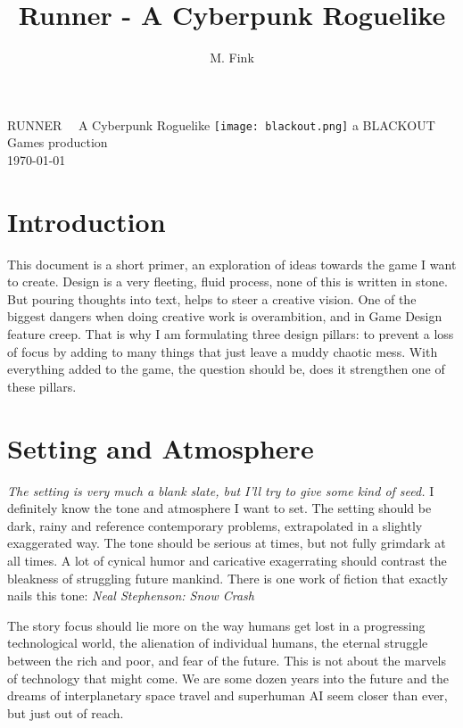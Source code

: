 \documentclass[11pt,a4paper, twocolumn]{article}
\begin{document}
\title{\LARGE{Runner - A Cyberpunk Roguelike}}
\author{M. Fink}



\begin{titlepage}
    \Huge{RUNNER}
    \Large{~~A Cyberpunk Roguelike}
    \vspace{2cm}
    \center
    \texttt{[image: blackout.png]}
    \vfill
    {a \Large{BLACKOUT Games} production}\\
    \today
\end{titlepage}


\section{Introduction}
This document is a short primer, an exploration of ideas towards the game I want to create.
Design is a very fleeting, fluid process, none of this is written in stone. But pouring
thoughts into text, helps to steer a creative vision.
One of the biggest dangers when doing creative work is overambition, and in Game Design
feature creep. That is why I am formulating three design pillars: to prevent a loss of
focus by adding to many things that just leave a muddy chaotic mess. With everything added
to the game, the question should be, does it strengthen one of these pillars.

\section{Setting and Atmosphere}
\textit{The setting is very much a blank slate, but I'll try to give some kind of seed.}
I definitely know the tone and atmosphere I want to set. The setting should be dark,
rainy and reference contemporary problems, extrapolated in a slightly exaggerated way.
The tone should be serious at times, but not fully grimdark at all times. A lot of
cynical humor and caricative exagerrating should contrast the bleakness of struggling
future mankind. There is one work of fiction that exactly nails this tone:
\textit{Neal Stephenson: Snow Crash}

The story focus should lie more on the way humans get lost in a progressing technological
world, the alienation of individual humans, the eternal struggle between the rich and
poor, and fear of the future. This is not about the marvels of technology that might come.
We are some dozen years into the future and the dreams of interplanetary space travel
and superhuman AI seem closer than ever, but just out of reach.
\end{document}
